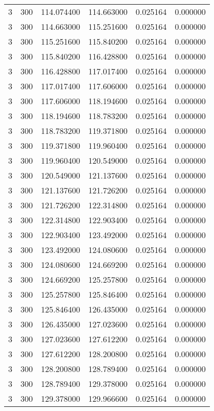 \begin{longtable}{rrrrrr}
3 & 300 & 114.074400 & 114.663000 & 0.025164 & 0.000000 \\
3 & 300 & 114.663000 & 115.251600 & 0.025164 & 0.000000 \\
3 & 300 & 115.251600 & 115.840200 & 0.025164 & 0.000000 \\
3 & 300 & 115.840200 & 116.428800 & 0.025164 & 0.000000 \\
3 & 300 & 116.428800 & 117.017400 & 0.025164 & 0.000000 \\
3 & 300 & 117.017400 & 117.606000 & 0.025164 & 0.000000 \\
3 & 300 & 117.606000 & 118.194600 & 0.025164 & 0.000000 \\
3 & 300 & 118.194600 & 118.783200 & 0.025164 & 0.000000 \\
3 & 300 & 118.783200 & 119.371800 & 0.025164 & 0.000000 \\
3 & 300 & 119.371800 & 119.960400 & 0.025164 & 0.000000 \\
3 & 300 & 119.960400 & 120.549000 & 0.025164 & 0.000000 \\
3 & 300 & 120.549000 & 121.137600 & 0.025164 & 0.000000 \\
3 & 300 & 121.137600 & 121.726200 & 0.025164 & 0.000000 \\
3 & 300 & 121.726200 & 122.314800 & 0.025164 & 0.000000 \\
3 & 300 & 122.314800 & 122.903400 & 0.025164 & 0.000000 \\
3 & 300 & 122.903400 & 123.492000 & 0.025164 & 0.000000 \\
3 & 300 & 123.492000 & 124.080600 & 0.025164 & 0.000000 \\
3 & 300 & 124.080600 & 124.669200 & 0.025164 & 0.000000 \\
3 & 300 & 124.669200 & 125.257800 & 0.025164 & 0.000000 \\
3 & 300 & 125.257800 & 125.846400 & 0.025164 & 0.000000 \\
3 & 300 & 125.846400 & 126.435000 & 0.025164 & 0.000000 \\
3 & 300 & 126.435000 & 127.023600 & 0.025164 & 0.000000 \\
3 & 300 & 127.023600 & 127.612200 & 0.025164 & 0.000000 \\
3 & 300 & 127.612200 & 128.200800 & 0.025164 & 0.000000 \\
3 & 300 & 128.200800 & 128.789400 & 0.025164 & 0.000000 \\
3 & 300 & 128.789400 & 129.378000 & 0.025164 & 0.000000 \\
3 & 300 & 129.378000 & 129.966600 & 0.025164 & 0.000000 \\

\end{longtable}
